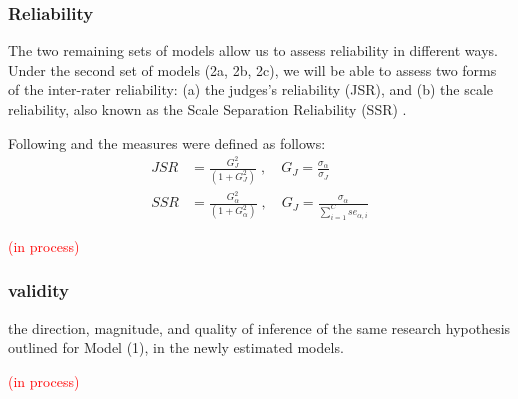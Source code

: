 \subsubsection{Reliability}
%
The two remaining sets of models allow us to assess reliability in different ways. Under the second set of models (2a, 2b, 2c), we will be able to assess two forms of the inter-rater reliability: (a) the judges's reliability (JSR), and (b) the scale reliability, also known as the Scale Separation Reliability (SSR) \citep{Bramley_2015}. 

Following \citet{Fisher_1992} and \citet{Wright_1996} the measures were defined as follows:
%
\begin{align}
	JSR &= \frac{ G^{2}_{J} }{ (1 + G^{2}_{J}) }\; , \quad G_{J} = \frac{ \sigma_{\alpha} } { \sigma_{J} } \label{eq:JSR} \\
	SSR &= \frac{ G^{2}_{\alpha} }{ (1 + G^{2}_{\alpha}) }\; , \quad G_{J} = \frac{ \sigma_{\alpha} } { \sum_{i=1}^{C} se_{\alpha, i} } \label{eq:SSR}
\end{align}
%

\textcolor{red}{(in process)}

\begin{comment}
	compare the Scale Separation Reliability (SSR, an inter-rater reliability measure), coming from CJ methods, with others for other methods
	
	- No intra-rater reliability, also known as test-retest reliability (Verhavert_2018, Reliability_wiki_2022) 
	- No Inter-method reliability,  assesses the degree to which test scores are consistent when there is a variation in the methods or instruments used (Verhavert_2018, Reliability_wiki_2022) 
	- No comparison of SSR vs the true correlation of the latent scale and entropy measures 
	* Justification: (Verhavert_2018, p. 156) " simulation studies could resolve the inconclusiveness regarding the SSR as a correlation with the truth."
\end{comment}
%
%
\subsubsection{validity}
%
the direction, magnitude, and quality of inference of the same research hypothesis outlined for Model (1), in the newly estimated models.

\textcolor{red}{(in process)}

\begin{comment}
	correlate latent scores (from different methods) with entropy measures (see research proposal)
	
	\textbf{critique:} What about decision statements or think at loud rating process? (is it possible), \citet{Lesterhuis_2018} has shown their usefulness, while \citet{Boonen_et_al_2020} signals the need to know about the inner working of judgment processes.
\end{comment}
%
%
